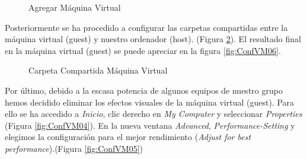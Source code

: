 \documentclass{scrartcl}
\begin{document}
\begin{figure}[H]
	
	\centering
	\caption{Agregar Máquina Virtual}
	\label{fig:ConfVM02}
	
\end{figure}

Posteriormente se ha procedido a configurar las carpetas compartidas entre la máquina virtual (guest) y nuestro ordenador (host). (Figura \ref{fig:ConfVM03}). El resultado final en la máquina virtual (guest) se puede apreciar en la figura \ref{fig:ConfVM06}.

\begin{figure}[H]
	
	\centering
	\caption{Carpeta Compartida Máquina Virtual}
	\label{fig:ConfVM03}
	
\end{figure}

Por último, debido a la escasa potencia de algunos equipos de nuestro grupo hemos decidido eliminar los efectos visuales de la máquina virtual (guest). Para ello se ha accedido a \textit{Inicio}, clic derecho en \textit{My Computer} y seleccionar \textit{Properties} (Figura \ref{fig:ConfVM04}). En la nueva ventana \textit{Advanced}, \textit{Performance-Setting} y elegimos la configuración para el mejor rendimiento (\textit{Adjust for best performance}).(Figura \ref{fig:ConfVM05})
\end{document}
